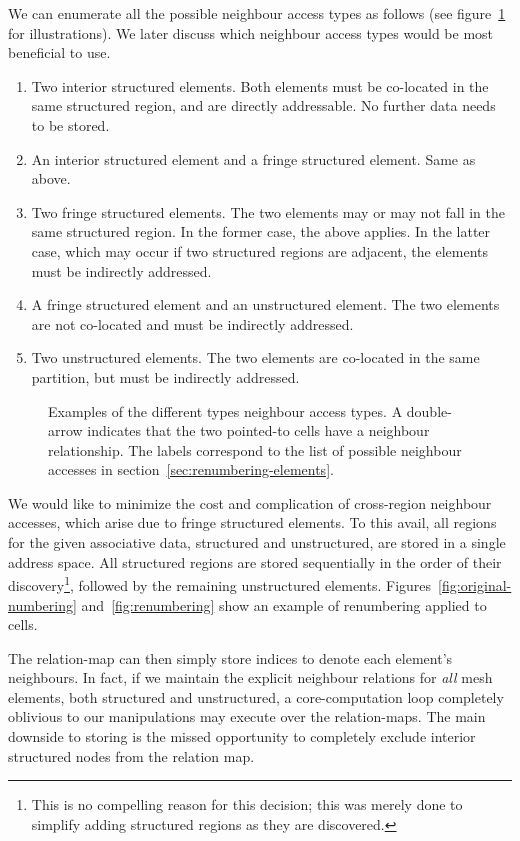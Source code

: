 We can enumerate all the possible neighbour access types as follows (see figure~\ref{fig:neighbour-types} for illustrations). We later discuss which neighbour access types would be most beneficial to use.
\begin{enumerate}[label=\alph*)]
\item Two interior structured elements.
Both elements must be co-located in the same structured region, and are directly addressable. No further data needs to be stored.
\item An interior structured element and a fringe structured element.
Same as above.
\item Two fringe structured elements.
The two elements may or may not fall in the same structured region. In the former case, the above applies. In the latter case, which may occur if two structured regions are adjacent, the elements must be indirectly addressed.
\item A fringe structured element and an unstructured element.
The two elements are not co-located and must be indirectly addressed.
\item Two unstructured elements.
The two elements are co-located in the same partition, but must be indirectly addressed.
\end{enumerate}

\begin{figure}
	
	\caption{Examples of the different types neighbour access types. A double-arrow indicates that the two pointed-to cells have a neighbour relationship. The labels correspond to the list of possible neighbour accesses in section~\ref{sec:renumbering-elements}.}
	\label{fig:neighbour-types}
\end{figure}

We would like to minimize the cost and complication of cross-region neighbour accesses, which arise due to fringe structured elements. To this avail, all regions for the given associative data, structured and unstructured, are stored in a single address space. All structured regions are stored sequentially in the order of their discovery\footnote{This is no compelling reason for this decision; this was merely done to simplify adding structured regions as they are discovered.}, followed by the remaining unstructured elements. Figures~\ref{fig:original-numbering} and~\ref{fig:renumbering} show an example of renumbering applied to cells.

The relation-map can then simply store indices to denote each element's neighbours. In fact, if we maintain the explicit neighbour relations for \emph{all} mesh elements, both structured and unstructured, a core-computation loop completely oblivious to our manipulations may execute over the relation-maps.
The main downside to storing is the missed opportunity to completely exclude interior structured nodes from the relation map.


